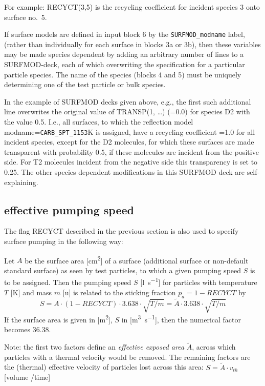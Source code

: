 For example: RECYCT(3,5) is the recycling coefficient for incident species 3
onto surface no.\ 5.

If surface models are defined in input block 6 by the \lstinline|SURFMOD_modname|
label, (rather than individually for each surface in blocks 3a or 3b), then
these variables may be made species dependent by adding an arbitrary number of
lines to a SURFMOD-deck, each of which overwriting the specification for a
particular particle species.
The name of the species (blocks 4 and 5) must be uniquely determining one of
the test particle or bulk species.

In the example of SURFMOD decks given above, e.g., the first such additional
line overwrites the original value of TRANSP(1, \dots) (=0.0) for species D2
with the value 0.5.
I.e., all surfaces, to which the reflection model
modname=\lstinline|CARB_SPT_1153|K is assigned, have a recycling coefficient =1.0
for all incident species, except for the D2 molecules, for which these surfaces
are made transparent with probability 0.5, if these molecules are incident from
the positive side.
For T2 molecules incident from the negative side this transparency is set to
0.25.
The other species dependent modifications in this SURFMOD deck are
self-explaining.

\subsection {effective pumping speed}\label{sec2.6.1}

The flag RECYCT described in the previous section is also used to specify
surface pumping in the following way:

Let $A$ be the surface area [\si{\square\centi\metre}] of a surface (additional
surface or non-default standard surface) as seen by test particles, to which a
given pumping speed $S$ is to be assigned.
Then the pumping speed $S$ [\si{\litre\per\second}] for particles with
temperature $T$ [\si{\kelvin}] and mass $m$ [\si{\atomicmassunit}] is related
to the sticking fraction $p_a = 1 -RECYCT$ by
\begin{equation}
  \label{pumping-speed} S = A \cdot (1 - RECYCT) \cdot 3.638 \cdot \sqrt{T/m} =
  \tilde A \cdot 3.638 \cdot \sqrt{T/m}
\end{equation}
If the surface area is
given in [\si{\square\metre}], $S$ in [\si{\cubic\metre\per\second}], then the
numerical factor becomes \num{36.38}.

Note: the first two factors define an \emph{effective exposed area} $\tilde A$,
across which particles with a thermal velocity would be removed.
The remaining factors are the (thermal) effective velocity of particles lost
across this area: $S = \tilde A \cdot  v_{th}$ [volume /time]

